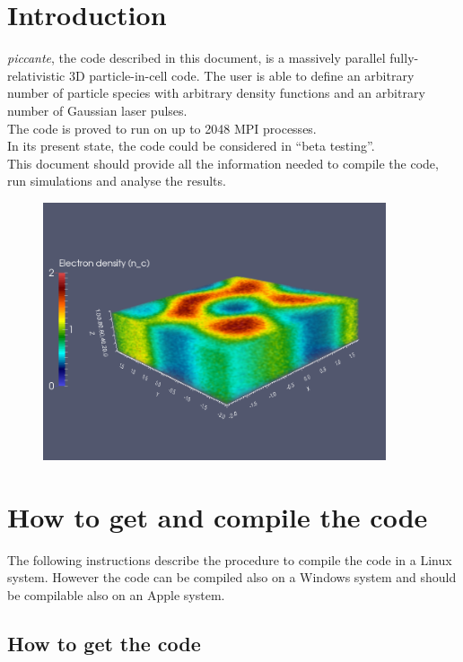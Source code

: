 \documentclass[11pt,a4paper]{report}
\begin{document}
\chapter{Introduction}
\emph{piccante}, the code described in this document, is a massively parallel fully-relativistic 3D particle-in-cell code. The user is able to define an arbitrary number of particle species with arbitrary density functions and an arbitrary number of Gaussian laser pulses.\\
The code is proved to run on up to 2048 MPI processes.\\
In its present state, the code could be considered in ``beta testing''.\\
This document should provide all the information needed to compile the code, run simulations and analyse the results.
\begin{figure}[h!]
\centering
\includegraphics[width=0.9\textwidth]{3d_marta.png}
\end{figure}



\chapter{How to get and compile the code}
The following instructions describe the procedure to compile the code in a Linux system. However the code can be compiled also on a Windows system and should be compilable also on an Apple system.
\section{How to get the code} \label{section_getcode}
\end{document}
